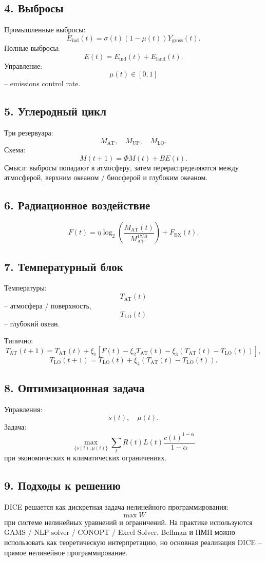 \documentclass[12pt,a4paper]{article}
\begin{document}
\subsection*{4. Выбросы}
Промышленные выбросы:
\[
E_{\mathrm{ind}}(t)=\sigma(t)(1-\mu(t))Y_{\mathrm{gross}}(t).
\]
Полные выбросы:
\[
E(t)=E_{\mathrm{ind}}(t)+E_{\mathrm{land}}(t).
\]
Управление:
\[
\mu(t)\in[0,1]
\]
-- emissions control rate.

\subsection*{5. Углеродный цикл}
Три резервуара:
\[
M_{\mathrm{AT}},\quad M_{\mathrm{UP}},\quad M_{\mathrm{LO}}.
\]
Схема:
\[
M(t+1)=\Phi M(t)+BE(t).
\]
Смысл: выбросы попадают в атмосферу, затем перераспределяются между атмосферой, верхним океаном / биосферой и глубоким океаном.

\subsection*{6. Радиационное воздействие}
\[
F(t)=\eta\log_2\left(\frac{M_{\mathrm{AT}}(t)}{M_{\mathrm{AT}}^{1750}}\right)+F_{\mathrm{EX}}(t).
\]

\subsection*{7. Температурный блок}
Температуры:
\[
T_{\mathrm{AT}}(t)
\]
-- атмосфера / поверхность,
\[
T_{\mathrm{LO}}(t)
\]
-- глубокий океан.

Типично:
\[
T_{\mathrm{AT}}(t+1)=T_{\mathrm{AT}}(t)+\xi_1[F(t)-\xi_2T_{\mathrm{AT}}(t)-\xi_3(T_{\mathrm{AT}}(t)-T_{\mathrm{LO}}(t))],
\]
\[
T_{\mathrm{LO}}(t+1)=T_{\mathrm{LO}}(t)+\xi_4(T_{\mathrm{AT}}(t)-T_{\mathrm{LO}}(t)).
\]

\subsection*{8. Оптимизационная задача}
Управления:
\[
s(t),\quad \mu(t).
\]
Задача:
\[
\max_{\{s(t),\mu(t)\}}\sum_t R(t)L(t)\frac{c(t)^{1-\alpha}}{1-\alpha}
\]
при экономических и климатических ограничениях.

\subsection*{9. Подходы к решению}
DICE решается как дискретная задача нелинейного программирования:
\[
\max W
\]
при системе нелинейных уравнений и ограничений. На практике используются GAMS / NLP solver / CONOPT / Excel Solver. Bellman и ПМП можно использовать как теоретическую интерпретацию, но основная реализация DICE -- прямое нелинейное программирование.
\end{document}
